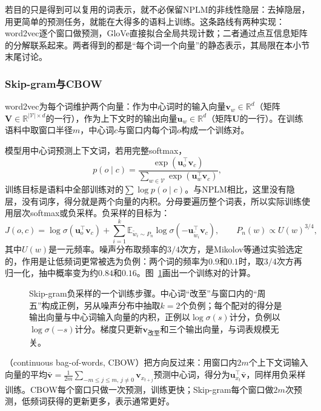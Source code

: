 若目的只是得到可以复用的词表示，就不必保留NPLM的非线性隐层：去掉隐层，用更简单的预测任务，就能在大得多的语料上训练。这条路线有两种实现：word2vec逐个窗口做预测，GloVe直接拟合全局共现计数；二者通过点互信息矩阵的分解联系起来。两者得到的都是“每个词一个向量”的静态表示，其局限在本小节末尾讨论。

\subsubsection{Skip-gram与CBOW}
\label{sec:nlp-classical-skipgram}

word2vec为每个词维护两个向量：作为中心词时的输入向量$\bm v_w\in\mathbb R^{d}$（矩阵$\bm V\in\mathbb R^{|\mathcal V|\times d}$的一行），作为上下文时的输出向量$\bm u_w\in\mathbb R^{d}$（矩阵$\bm U$的一行）。在训练语料中取窗口半径$m$，中心词$c$与窗口内每个词$o$构成一个训练对。

模型用中心词预测上下文词，若用完整softmax，
\[
  p(o\mid c)=\frac{\exp(\bm u_o^{\top}\bm v_c)}{\sum_{w\in\mathcal V}\exp(\bm u_w^{\top}\bm v_c)},
\]
训练目标是语料中全部训练对的$\sum\log p(o\mid c)$。与NPLM相比，这里没有隐层，没有词序，得分就是两个向量的内积。分母要遍历整个词表，所以实际训练使用层次softmax或负采样。负采样的目标为：
\begin{equation}
  J(o,c)=\log\sigma(\bm u_o^{\top}\bm v_c)+\sum_{i=1}^{k}\mathbb E_{\tilde w_i\sim P_n}\log\sigma(-\bm u_{\tilde w_i}^{\top}\bm v_c),\qquad
  P_n(w)\propto U(w)^{3/4},
  \label{eq:nlp-classical-skipgram-neg}
\end{equation}
其中$U(w)$是一元频率。噪声分布取频率的$3/4$次方，是Mikolov等通过实验选定的，作用是让低频词更常被选为负例：两个词的频率为$0.9$和$0.1$时，取$3/4$次方再归一化，抽中概率变为约$0.84$和$0.16$。图~\ref{fig:nlp-classical-skipgram}画出一个训练对的计算。

\begin{figure}[htbp]
  \centering
  
  \caption{Skip-gram负采样的一个训练步骤。中心词“改至”与窗口内的“周五”构成正例，另从噪声分布中抽取$k=2$个负例；每个配对的得分是输出向量与中心词输入向量的内积，正例以$\log\sigma(s)$计分，负例以$\log\sigma(-s)$计分。梯度只更新$\bm v_{\text{改至}}$和三个输出向量，与词表规模无关。}
  \label{fig:nlp-classical-skipgram}
\end{figure}

（continuous bag-of-words, CBOW）把方向反过来：用窗口内$2m$个上下文词输入向量的平均$\bar{\bm v}=\frac{1}{2m}\sum_{-m\leq j\leq m,\,j\neq0}\bm v_{x_{t+j}}$预测中心词，得分为$\bm u_{x_t}^{\top}\bar{\bm v}$，同样用负采样训练。CBOW每个窗口只做一次预测，训练更快；Skip-gram每个窗口做$2m$次预测，低频词获得的更新更多，表示通常更好。


